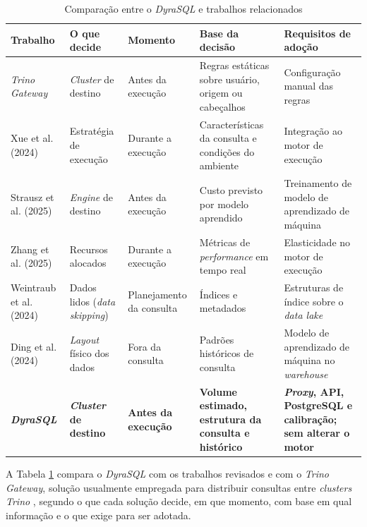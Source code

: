 \begin{table}[H]
	\centering
	\caption{Comparação entre o \textit{DyraSQL} e trabalhos relacionados}
	\label{tab:comparativo}
	\footnotesize
	\begin{tabular}{p{2.3cm}p{3.0cm}p{1.9cm}p{3.0cm}p{3.2cm}}
	\hline
	\textbf{Trabalho} & \textbf{O que decide} & \textbf{Momento} & \textbf{Base da decisão} & \textbf{Requisitos de adoção} \\
	\hline
	\textit{Trino Gateway} & \textit{Cluster} de destino & Antes da execução & Regras estáticas sobre usuário, origem ou cabeçalhos & Configuração manual das regras \\
	Xue et al. (2024) & Estratégia de execução & Durante a execução & Características da consulta e condições do ambiente & Integração ao motor de execução \\
	Strausz et al. (2025) & \textit{Engine} de destino & Antes da execução & Custo previsto por modelo aprendido & Treinamento de modelo de aprendizado de máquina \\
	Zhang et al. (2025) & Recursos alocados & Durante a execução & Métricas de \textit{performance} em tempo real & Elasticidade no motor de execução \\
	Weintraub et al. (2024) & Dados lidos (\textit{data skipping}) & Planejamento da consulta & Índices e metadados & Estruturas de índice sobre o \textit{data lake} \\
	Ding et al. (2024) & \textit{Layout} físico dos dados & Fora da consulta & Padrões históricos de consulta & Modelo de aprendizado de máquina no \textit{warehouse} \\
	\textbf{\textit{DyraSQL}} & \textbf{\textit{Cluster} de destino} & \textbf{Antes da execução} & \textbf{Volume estimado, estrutura da consulta e histórico} & \textbf{\textit{Proxy}, API, PostgreSQL e calibração; sem alterar o motor} \\
	\hline
	\end{tabular}
\end{table}

A Tabela \ref{tab:comparativo} compara o \textit{DyraSQL} com os trabalhos revisados e com o \textit{Trino Gateway}, solução usualmente empregada para distribuir consultas entre \textit{clusters} \textit{Trino} \cite{trinogateway}, segundo o que cada solução decide, em que momento, com base em qual informação e o que exige para ser adotada.
